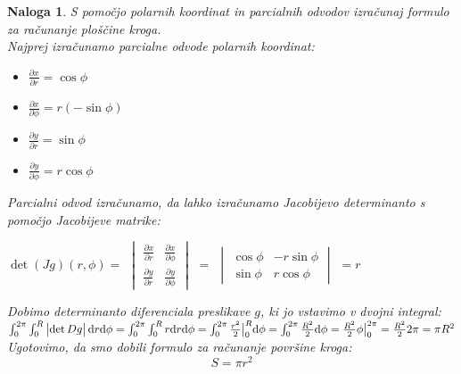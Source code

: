 \documentclass[12pt, a4paper]{article}
\newtheorem{naloga}{Naloga}
\begin{document}
\begin{naloga}
S pomočjo polarnih koordinat in parcialnih odvodov izračunaj formulo za računanje ploščine kroga. \\
\emph
{Najprej izračunamo parcialne odvode polarnih koordinat:}

\begin{itemize}
\item $\frac{\partial x}{\partial r}= \cos \phi$
\item $\frac{\partial x}{\partial \phi}= r  (-\sin \phi)$
\item $\frac{\partial y}{\partial r}= \sin \phi$
\item $\frac{\partial y}{\partial \phi}= r  \cos \phi$ \\
\end{itemize}
\emph
{Parcialni odvod izračunamo, da lahko izračunamo Jacobijevo determinanto s pomočjo Jacobijeve matrike:}
\\
\begin{center}
 {
$\det (Jg)(r,\phi)=$ \large $ \begin{vmatrix} \frac{\partial x}{\partial r}  &  \frac{\partial x}{\partial \phi}  \\  \frac{\partial y}{\partial r}  &  \frac{\partial y}{\partial \phi}  \end{vmatrix} $ $=$ \normalsize $\begin{vmatrix} \cos \phi & -r \sin \phi \\ \sin \phi & r \cos \phi \end{vmatrix} $  $= r$
}
\end{center}

\emph
{Dobimo determinanto diferenciala preslikave $g$, ki jo vstavimo v dvojni integral:} \\

$ \int^{2\pi}_{0} \int^{R}_{0}   \begin{vmatrix} \det Dg \end{vmatrix}  \mathrm{d} r \mathrm{d}\phi \\
 =  \int^{2\pi}_{0} \int^{R}_{0}  r \mathrm{d} r \mathrm{d}\phi \\
 =  \int^{2\pi}_{0} \frac{r^2}{2} \big|^{R}_{0} \mathrm{d}\phi \\
 =  \int^{2\pi}_{0} \frac{R^2}{2} \mathrm{d}\phi \\
 =  \frac{R^2}{2} \phi  \big|^{2\pi}_{0} \\
 =  \frac{R^2}{2} 2\pi \\
 =  \pi R^2 $ \\

\emph
{Ugotovimo, da smo dobili formulo za računanje površine kroga:}
$$
S=\pi r^2
$$
\end{naloga}
\end{document}
